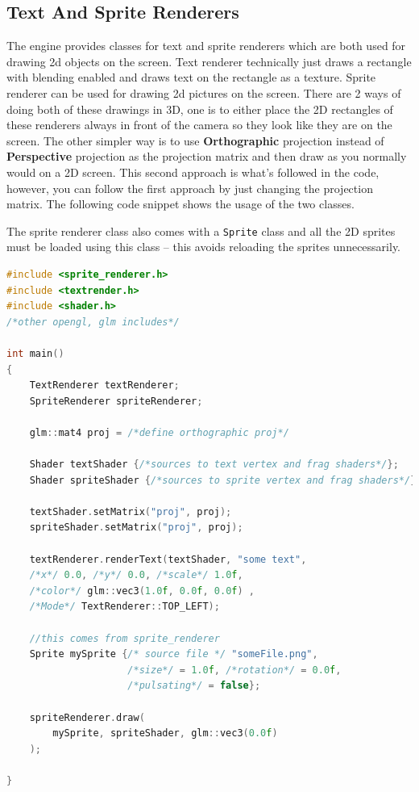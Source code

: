 \subsection{Text And Sprite Renderers}
The engine provides classes for text and sprite renderers which are both used for drawing 2d objects on the screen. Text renderer technically just draws a rectangle with blending enabled and draws text on the rectangle as a texture. Sprite renderer can be used for drawing 2d pictures on the screen. There are 2 ways of doing both of these drawings in 3D, one is to either place the 2D rectangles of these renderers always in front of the camera so they look like they are on the screen. The other simpler way is to use \textbf{Orthographic} projection instead of \textbf{Perspective} projection as the projection matrix and then draw as you normally would on a 2D screen. This second approach is what's followed in the code, however, you can follow the first approach by just changing the projection matrix. The following code snippet shows the usage of the two classes.

The sprite renderer class also comes with a \texttt{Sprite} class and all the 2D sprites must be loaded using this class -- this avoids reloading the sprites unnecessarily.

\begin{lstlisting}[language={C++}]
#include <sprite_renderer.h>
#include <textrender.h>
#include <shader.h>
/*other opengl, glm includes*/

int main() 
{
    TextRenderer textRenderer;
    SpriteRenderer spriteRenderer;

    glm::mat4 proj = /*define orthographic proj*/

    Shader textShader {/*sources to text vertex and frag shaders*/};
    Shader spriteShader {/*sources to sprite vertex and frag shaders*/};

    textShader.setMatrix("proj", proj);
    spriteShader.setMatrix("proj", proj);

    textRenderer.renderText(textShader, "some text", 
	/*x*/ 0.0, /*y*/ 0.0, /*scale*/ 1.0f, 	
    /*color*/ glm::vec3(1.0f, 0.0f, 0.0f) , 
    /*Mode*/ TextRenderer::TOP_LEFT);

    //this comes from sprite_renderer
    Sprite mySprite {/* source file */ "someFile.png", 
                     /*size*/ = 1.0f, /*rotation*/ = 0.0f, 
                     /*pulsating*/ = false};

    spriteRenderer.draw(
        mySprite, spriteShader, glm::vec3(0.0f)
    );

}
\end{lstlisting}

